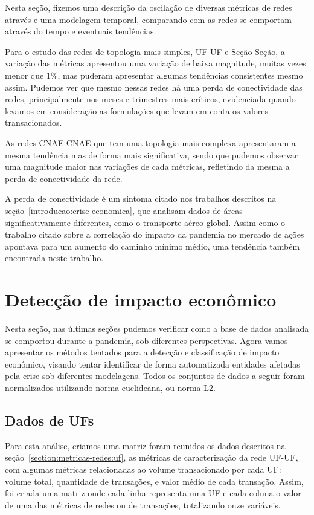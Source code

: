 Nesta seção, fizemos uma descrição da oscilação de diversas métricas de redes através e uma modelagem temporal, comparando com as redes se comportam através do tempo e eventuais tendências.

Para o estudo das redes de topologia mais simples, UF-UF e Seção-Seção, a variação das métricas apresentou uma variação de baixa magnitude, muitas vezes menor que 1\%, mas puderam apresentar algumas tendências consistentes mesmo assim. Pudemos ver que mesmo nessas redes há uma perda de conectividade das redes, principalmente nos meses e trimestres mais críticos, evidenciada quando levamos em consideração as formulações que levam em conta os valores transacionados.

As redes CNAE-CNAE que tem uma topologia mais complexa apresentaram a mesma tendência mas de forma mais significativa, sendo que pudemos observar uma magnitude maior nas variações de cada métricas, refletindo da mesma a perda de conectividade da rede.

A perda de conectividade é um sintoma citado nos trabalhos descritos na seção~\ref{introducao:crise-economica}, que analisam dados de áreas significativamente diferentes, como o transporte aéreo global. Assim como o trabalho citado sobre a correlação do impacto da pandemia no mercado de ações apontava para um aumento do caminho mínimo médio, uma tendência também encontrada neste trabalho.

\section{Detecção de impacto econômico}
\label{section:deteccao-impacto}

Nesta seção, nas últimas seções pudemos verificar como a base de dados analisada se comportou durante a pandemia, sob diferentes perspectivas. Agora vamos apresentar os métodos tentados para a detecção e classificação de impacto econômico, visando tentar identificar de forma automatizada entidades afetadas pela crise sob diferentes modelagens. Todos os conjuntos de dados a seguir foram normalizados utilizando norma euclideana, ou norma L2.

\subsection{Dados de UFs}
\label{section:deteccao-impacto:uf}

Para esta análise, criamos uma matriz foram reunidos os dados descritos na seção~\ref{section:metricas-redes:uf}, as métricas de caracterização da rede UF-UF, com algumas métricas relacionadas ao volume transacionado por cada UF: volume total, quantidade de transações, e valor médio de cada transação. Assim, foi criada uma matriz onde cada linha representa uma UF e cada coluna o valor de uma das métricas de redes ou de transações, totalizando onze variáveis.

